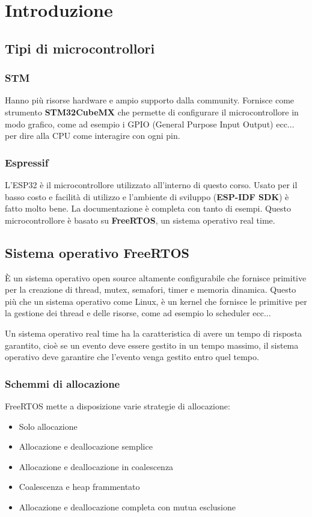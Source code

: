 \documentclass[a4paper]{article}
\begin{document}


\tableofcontents
\pagebreak

\section{Introduzione}
\subsection{Tipi di microcontrollori}
\subsubsection{STM}
Hanno più risorse hardware e ampio supporto dalla community. Fornisce come strumento
\textbf{STM32CubeMX} che permette di configurare il microcontrollore in modo grafico,
come ad esempio i GPIO (General Purpose Input Output) ecc... per dire alla CPU come 
interagire con ogni pin.

\subsubsection{Espressif}
L'ESP32 è il microcontrollore utilizzato all'interno di questo corso. Usato per il basso
costo e facilità di utilizzo e l'ambiente di sviluppo (\textbf{ESP-IDF SDK}) è fatto
molto bene. La documentazione è completa con tanto di esempi. Questo microcontrollore
è basato su \textbf{FreeRTOS}, un sistema operativo real time.

\subsection{Sistema operativo FreeRTOS}
È un sistema operativo open source altamente configurabile che fornisce primitive per
la creazione di thread, mutex, semafori, timer e memoria dinamica. Questo più che un 
sistema operativo come Linux, è un kernel che fornisce le primitive per la gestione
dei thread e delle risorse, come ad esempio lo scheduler ecc...

Un sistema operativo real time ha la caratteristica di avere un tempo di risposta
garantito, cioè se un evento deve essere gestito in un tempo massimo, il sistema
operativo deve garantire che l'evento venga gestito entro quel tempo.

\subsubsection{Schemmi di allocazione}
FreeRTOS mette a disposizione varie strategie di allocazione:
\begin{itemize}
  \item Solo allocazione
  \item Allocazione e deallocazione semplice
  \item Allocazione e deallocazione in coalescenza
  \item Coalescenza e heap frammentato
  \item Allocazione e deallocazione completa con mutua esclusione
\end{itemize}
\end{document}
